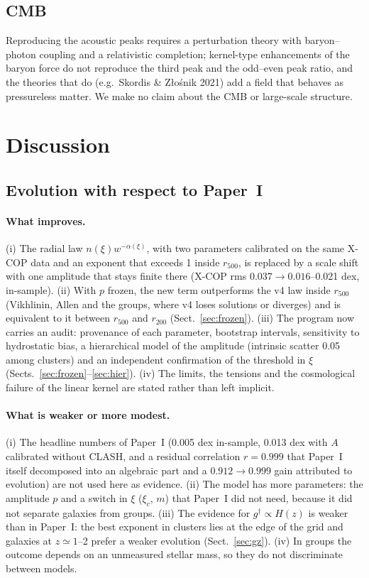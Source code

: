 \documentclass[11pt,a4paper]{article}
\newcommand{\gdag}{g^{\dagger}}
\begin{document}
\subsection{CMB}
Reproducing the acoustic peaks requires a perturbation theory with baryon--photon coupling and a relativistic completion; kernel-type enhancements of the baryon force do not reproduce the third peak and the odd--even peak ratio, and the theories that do (e.g.\ Skordis \& Z\l{}o\'snik 2021) add a field that behaves as pressureless matter. We make no claim about the CMB or large-scale structure.

\section{Discussion}
\label{sec:disc}
\subsection{Evolution with respect to Paper~I}
\label{sec:evol}
\paragraph{What improves.} (i) The radial law $n(\xi)w^{-\alpha(\xi)}$, with two parameters calibrated on the same X-COP data and an exponent that exceeds 1 inside $r_{500}$, is replaced by a scale shift with one amplitude that stays finite there (X-COP rms $0.037\to0.016$--0.021 dex, in-sample). (ii) With $p$ frozen, the new term outperforms the v4 law inside $r_{500}$ (Vikhlinin, Allen and the groups, where v4 loses solutions or diverges) and is equivalent to it between $r_{500}$ and $r_{200}$ (Sect.~\ref{sec:frozen}). (iii) The program now carries an audit: provenance of each parameter, bootstrap intervals, sensitivity to hydrostatic bias, a hierarchical model of the amplitude (intrinsic scatter 0.05 among clusters) and an independent confirmation of the threshold in $\xi$ (Sects.~\ref{sec:frozen}--\ref{sec:hier}). (iv) The limits, the tensions and the cosmological failure of the linear kernel are stated rather than left implicit.

\paragraph{What is weaker or more modest.} (i) The headline numbers of Paper~I (0.005 dex in-sample, 0.013 dex with $A$ calibrated without CLASH, and a residual correlation $r=0.999$ that Paper~I itself decomposed into an algebraic part and a $0.912\to0.999$ gain attributed to evolution) are not used here as evidence. (ii) The model has more parameters: the amplitude $p$ and a switch in $\xi$ ($\xi_c$, $m$) that Paper~I did not need, because it did not separate galaxies from groups. (iii) The evidence for $\gdag\propto H(z)$ is weaker than in Paper~I: the best exponent in clusters lies at the edge of the grid and galaxies at $z\simeq1$--2 prefer a weaker evolution (Sect.~\ref{sec:gz}). (iv) In groups the outcome depends on an unmeasured stellar mass, so they do not discriminate between models.
\end{document}

